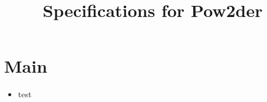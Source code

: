 \documentclass[article]{revtex4}
\begin{document}
\title{Specifications for Pow2der}


\maketitle

\section{Main}

\begin{itemize}
\item test
\end{itemize}
\end{document}
